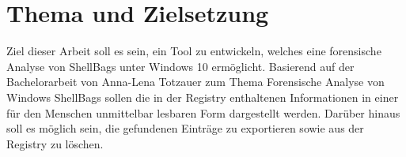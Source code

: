 \section{Thema und Zielsetzung}
Ziel dieser Arbeit soll es sein, ein Tool zu entwickeln, welches eine forensische Analyse von ShellBags unter Windows 10 ermöglicht. Basierend auf der Bachelorarbeit von Anna-Lena Totzauer zum Thema \glqq Forensische Analyse von Windows ShellBags\grqq{} sollen die in der Registry enthaltenen Informationen in einer für den Menschen unmittelbar lesbaren Form dargestellt werden. Darüber hinaus soll es möglich sein, die gefundenen Einträge zu exportieren sowie aus der Registry zu löschen.